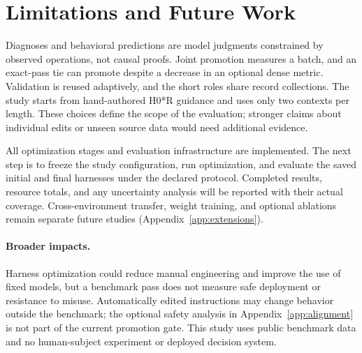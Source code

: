 \documentclass[letterpaper]{article} %
\begin{document}






\section{Limitations and Future Work}
\label{sec:limitations}

Diagnoses and behavioral predictions are model judgments constrained by observed
operations, not causal proofs. Joint promotion measures a batch, and an
exact-pass tie can promote despite a decrease in an optional dense metric.
Validation is reused adaptively, and the short roles share record collections.
The study starts from hand-authored H0*R guidance and uses only two contexts per
length. These choices define the scope of the evaluation; stronger claims about
individual edits or unseen source data would need additional evidence.

All optimization stages and evaluation infrastructure are implemented. The next
step is to freeze the study configuration, run optimization, and evaluate the
saved initial and final harnesses under the declared protocol. Completed results,
resource totals, and any uncertainty analysis will be reported with their actual
coverage. Cross-environment transfer, weight training, and optional ablations
remain separate future studies (Appendix~\ref{app:extensions}).

\paragraph{Broader impacts.}
Harness optimization could reduce manual engineering and improve the use of
fixed models, but a benchmark pass does not measure safe deployment or resistance
to misuse. Automatically edited instructions may change behavior outside the
benchmark; the optional safety analysis in Appendix~\ref{app:alignment} is not
part of the current promotion gate. This study uses public benchmark data and
no human-subject experiment or deployed decision system.



\clearpage
\appendix


% 
\end{document}
